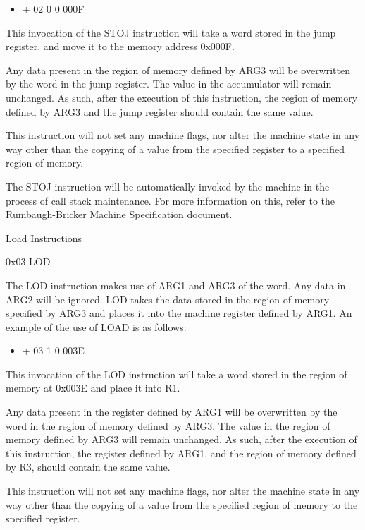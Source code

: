 \documentclass[]{article}
\providecommand{\tightlist}{%
  \setlength{\itemsep}{0pt}\setlength{\parskip}{0pt}}
\begin{document}
\begin{itemize}
\tightlist
\item
  + 02 0 0 000F
\end{itemize}

This invocation of the STOJ instruction will take a word stored in the
jump register, and move it to the memory address 0x000F.

Any data present in the region of memory defined by ARG3 will be
overwritten by the word in the jump register. The value in the
accumulator will remain unchanged. As such, after the execution of this
instruction, the region of memory defined by ARG3 and the jump register
should contain the same value.

This instruction will not set any machine flags, nor alter the machine
state in any way other than the copying of a value from the specified
register to a specified region of memory.

The STOJ instruction will be automatically invoked by the machine in the
process of call stack maintenance. For more information on this, refer
to the Rumbaugh-Bricker Machine Specification document.

Load Instructions

0x03 LOD

The LOD instruction makes use of ARG1 and ARG3 of the word. Any data in
ARG2 will be ignored. LOD takes the data stored in the region of memory
specified by ARG3 and places it into the machine register defined by
ARG1. An example of the use of LOAD is as follows:

\begin{itemize}
\tightlist
\item
  + 03 1 0 003E
\end{itemize}

This invocation of the LOD instruction will take a word stored in the
region of memory at 0x003E and place it into R1.

Any data present in the register defined by ARG1 will be overwritten by
the word in the region of memory defined by ARG3. The value in the
region of memory defined by ARG3 will remain unchanged. As such, after
the execution of this instruction, the register defined by ARG1, and the
region of memory defined by R3, should contain the same value.

This instruction will not set any machine flags, nor alter the machine
state in any way other than the copying of a value from the specified
region of memory to the specified register.
\end{document}
